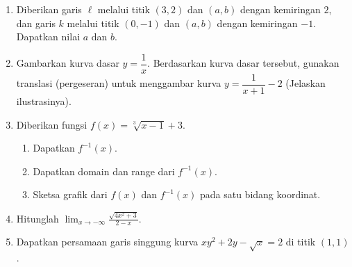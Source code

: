 \documentclass[10pt,openany,a4paper]{article}
\theoremstyle{definition}
\theoremstyle{definition}
\theoremstyle{plain}
\begin{document}
\newpage

\begin{enumerate}
    \item Diberikan garis $\ell$ melalui titik $(3,2)$ dan $(a,b)$ dengan kemiringan $2$, dan garis $k$ melalui titik $(0,-1)$ dan $(a,b)$ dengan kemiringan $-1$. Dapatkan nilai $a$ dan $b$.

    \item Gambarkan kurva dasar $y=\dfrac{1}{x}$. Berdasarkan kurva dasar tersebut, gunakan translasi (pergeseran) untuk menggambar kurva $y=\dfrac{1}{x+1}-2$ (Jelaskan ilustrasinya).

    \item Diberikan fungsi $f(x)=\sqrt[3]{x-1}+3$.
    \begin{enumerate}
        \item Dapatkan $f^{-1}(x)$.
        \item Dapatkan domain dan range dari $f^{-1}(x)$.
        \item Sketsa grafik dari $f(x)$ dan $f^{-1}(x)$ pada satu bidang koordinat.
    \end{enumerate}

    \item Hitunglah $\displaystyle\lim_{x\to-\infty}\frac{\sqrt{4x^2+3}}{2-x}$.

    \item Dapatkan persamaan garis singgung kurva $xy^2+2y-\sqrt{x}=2$ di titik $(1,1)$.
\end{enumerate}

\newpage
\end{document}
